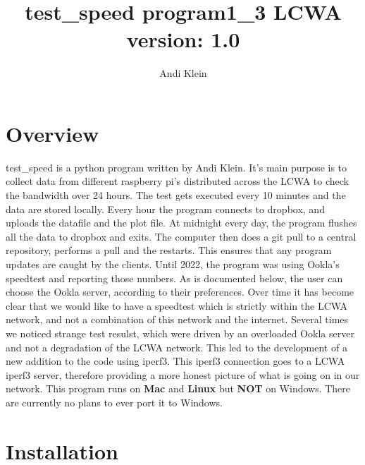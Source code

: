 \documentclass[12pt]{article}
\begin{document}
\author{ Andi Klein}
\title{ test\_speed program1\_3 LCWA \\ 
		\bf{version: 1.0}}
\maketitle
\setcounter{secnumdepth}{10}
\setcounter{tocdepth}{10}



\newenvironment{andilist}{\begin{itemize} \em}{\end{itemize}}

\section{Overview}
test\_speed is a python program written by Andi Klein. It's main purpose is to collect data from different raspberry pi's distributed across the LCWA to check the bandwidth over 24 hours. The test gets executed every 10 minutes and the data are stored locally. Every hour the program connects to dropbox, and uploads the datafile and the plot file. At midnight every day, the program flushes all the data to dropbox and exits. The computer then does a git pull to a central repository, performs a pull and the restarts. This ensures that any program updates are caught by the clients.
Until 2022, the program was using Ookla's speedtest and reporting those numbers. As is documented below, the user can choose the Ookla server, according to their preferences. Over time it has become clear that we would like to have a speedtest which is strictly within the LCWA network, and not a combination of this network and the internet. Several times we noticed strange test resulst, which were driven by an overloaded Ookla server and not a degradation of the LCWA network. This led to the development of a new addition to the code using iperf3. This iperf3 connection goes to a LCWA iperf3 server, therefore providing a more honest picture of what is going on in our network. This program runs on \textbf{Mac} and \textbf{Linux} but \textbf{NOT} on Windows. There are currently no plans to ever port it to Windows.

\section{Installation}
\end{document}
